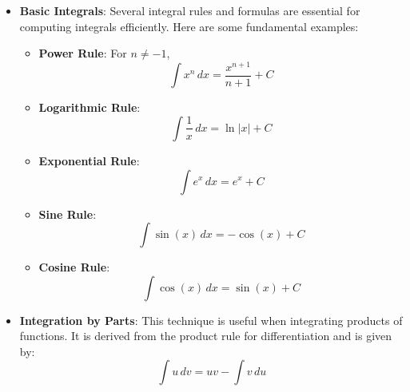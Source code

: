 \begin{itemize}
\begin{example}
\begin{solution}
\begin{enumerate}
    Calculate the expression inside the parentheses:
    \begin{align*}
    &1 + 4(0.8) + 2(0.5) + 4(0.3077) + 0.2 \\
    &= 1 + 3.2 + 1.0 + 1.2308 + 0.2 \\
    &= 6.6308.
    \end{align*}

    Compute the approximation:
    \[
    \int_0^{2} \frac{1}{1 + x^2} \, dx \approx \frac{0.5}{3} \times 6.6308 = \frac{3.3154}{3} \approx 1.1051.
    \]

    \item Compare with the exact value:
    \[
    \arctan 2 \approx 1.1071.
    \]
\end{enumerate}

The Simpson's Rule approximation is \( 1.1051 \), while the exact value is approximately \( 1.1071 \). The error is approximately \( 0.0020 \).
\end{solution}
\end{example}
\exampleline

\item \textbf{Basic Integrals}:
Several integral rules and formulas are essential for computing integrals efficiently. Here are some fundamental examples:

\begin{itemize}
\item \textbf{Power Rule}: For \( n \neq -1 \),
\[
\int x^n \, dx = \frac{x^{n+1}}{n+1} + C
\]
\item \textbf{Logarithmic Rule}:
\[
\int \frac{1}{x} \, dx = \ln|x| + C
\]
\item \textbf{Exponential Rule}:
\[
\int e^x \, dx = e^x + C
\]
\item \textbf{Sine Rule}:
\[
\int \sin(x) \, dx = -\cos(x) + C
\]
\item \textbf{Cosine Rule}:
\[
\int \cos(x) \, dx = \sin(x) + C
\]
\end{itemize}

\item \textbf{Integration by Parts}: 
This technique is useful when integrating products of functions. It is derived from the product rule for differentiation and is given by:
\[
\int u \, dv = uv - \int v \, du
\]






\end{itemize}
